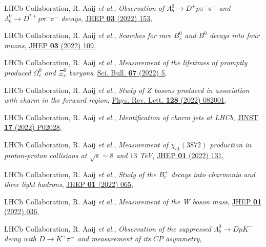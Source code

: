 \begin{cvcontent}
\begin{enumerate}[label={[\arabic*]}, leftmargin=1.5cm]
    \item LHCb Collaboration, R. Aaij \emph{et al.}, 
    \emph{Observation of $\Lambda_b^0\rightarrow D^+ p \pi^-\pi^-$ and $\Lambda_b^0\rightarrow D^{*+} p \pi^-\pi^-$ decays},
    \href{https://doi.org/10.1007/JHEP03(2022)153}{JHEP \textbf{03} (2022) 153},
    \item LHCb Collaboration, R. Aaij \emph{et al.}, 
    \emph{Searches for rare $B_s^0$ and $B^0$ decays into four muons},
    \href{https://doi.org/10.1007/JHEP03(2022)109}{JHEP \textbf{03} (2022) 109},
    \item LHCb Collaboration, R. Aaij \emph{et al.}, 
    \emph{Measurement of the lifetimes of promptly produced $\Omega^{0}_{c}$ and $\Xi^{0}_{c}$ baryons},
    \href{https://doi.org/10.1016/j.scib.2021.11.022}{Sci. Bull. \textbf{67} (2022) 5},
    \item LHCb Collaboration, R. Aaij \emph{et al.}, 
    \emph{Study of $Z$ bosons produced in association with charm in the forward region},
    \href{https://journals.aps.org/prl/abstract/10.1103/PhysRevLett.128.082001}{Phys. Rev. Lett. \textbf{128} (2022) 082001},
    \item LHCb Collaboration, R. Aaij \emph{et al.}, 
    \emph{Identification of charm jets at LHCb},
    \href{https://doi.org/10.1088/1748-0221/17/02/p02028}{JINST \textbf{17} (2022) P02028},
    \item LHCb Collaboration, R. Aaij \emph{et al.}, 
    \emph{Measurement of $\chi_{c1}(3872)$ production in proton-proton collisions at $\sqrt{s}=8$ and $13$ TeV},
    \href{https://doi.org/10.1007/JHEP01(2022)131}{JHEP \textbf{01} (2022) 131},
    \item LHCb Collaboration, R. Aaij \emph{et al.}, 
    \emph{Study of the $B_c^+$ decays into charmonia and three light hadrons},
    \href{https://doi.org/10.1007/JHEP01(2022)065}{JHEP \textbf{01} (2022) 065},
    \item LHCb Collaboration, R. Aaij \emph{et al.}, 
    \emph{Measurement of the W boson mass}, 
    \href{https://doi.org/10.1007/JHEP01(2022)036}{JHEP \textbf{01} (2022) 036},
    \item LHCb Collaboration, R. Aaij \emph{et al.}, 
    \emph{Observation of the suppressed $\Lambda_b^0\to D p K^-$ decay with $D\to K^+ \pi^-$ and measurement of its $C\!P$ asymmetry}, 

\end{enumerate}
\end{cvcontent}
